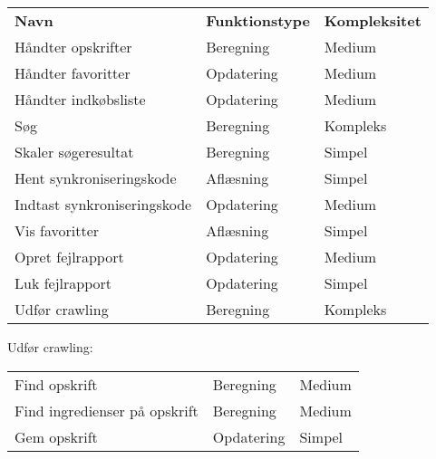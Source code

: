 \begin{table} [ht]
    \begin{tabular}{ l|l l }
  \hline
        \textbf{Navn}               & \textbf{Funktionstype} & \textbf{Kompleksitet} \\ %
        Håndter opskrifter          & Beregning              & Medium                \\ 
        Håndter favoritter          & Opdatering             & Medium                \\ 
        Håndter indkøbsliste        & Opdatering             & Medium                \\ 
        Søg                         & Beregning              & Kompleks              \\ 
        Skaler søgeresultat         & Beregning              & Simpel                \\ 
        Hent synkroniseringskode    & Aflæsning              & Simpel                \\ 
        Indtast synkroniseringskode & Opdatering             & Medium                \\ 
        Vis favoritter              & Aflæsning              & Simpel                \\ 
        Opret fejlrapport           & Opdatering             & Medium                \\ 
        Luk fejlrapport             & Opdatering             & Simpel                \\ 
        Udfør crawling              & Beregning              & Kompleks              \\ \hline
    \end{tabular}
\end{table}

Udfør crawling:

\begin{table} [ht]
    \begin{tabular}{ l l l }
    \hline
        Find opskrift                 & Beregning  & Medium \\
        Find ingredienser på opskrift & Beregning  & Medium \\ 
        Gem opskrift                  & Opdatering & Simpel \\ \hline
    \end{tabular}
\end{table}
